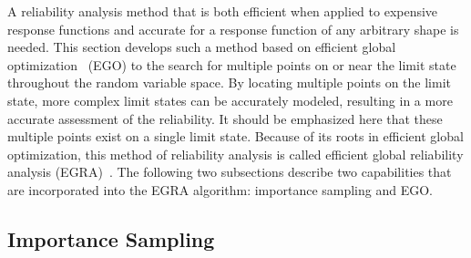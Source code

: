 
A reliability analysis method that is both efficient when applied to
expensive response functions and accurate for a response function of
any arbitrary shape is needed. This section develops such a method
based on efficient global optimization~\cite{Jon98} (EGO) to the
search for multiple points on or near the limit state throughout the
random variable space. By locating multiple points on the limit state,
more complex limit states can be accurately modeled, resulting in a
more accurate assessment of the reliability. It should be emphasized
here that these multiple points exist on a single limit state. Because
of its roots in efficient global optimization, this method of
reliability analysis is called efficient global reliability analysis
(EGRA)~\cite{Bichon2007}.  The following two subsections describe two
capabilities that are incorporated into the EGRA algorithm: importance
sampling and EGO.

\subsection{Importance Sampling}\label{uq:reliability:global:ais}

